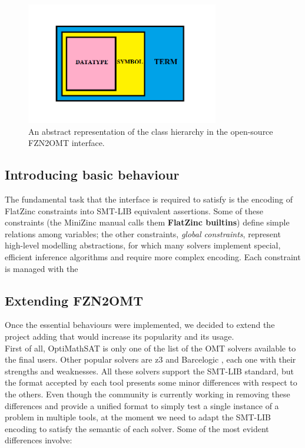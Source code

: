 \begin{figure}
    \centering
    \includegraphics[width=0.75\textwidth]{images/hierarchy.png}
    \caption{An abstract representation of the class hierarchy in the open-source FZN2OMT interface.}
    \label{fig:my_label}
\end{figure}

\subsection{Introducing basic behaviour}

The fundamental task that the interface is required to satisfy is the encoding of FlatZinc constraints into SMT-LIB equivalent assertions. Some of these constraints (the MiniZinc manual calls them \textbf{FlatZinc builtins}) define simple relations among variables; the other constraints, \textit{global constraints}, represent high-level modelling abstractions, for which many solvers implement special, efficient inference algorithms and require more complex encoding. Each constraint is managed with the 

\subsection{Extending FZN2OMT}

Once the essential behaviours were implemented, we decided to extend the project adding that would increase its popularity and its usage.\\
First of all, OptiMathSAT is only one of the list of the OMT solvers available to the final users. Other popular solvers are z3 \cite{z3prover} and Barcelogic \cite{barcelogic}, each one with their strengths and weaknesses. All these solvers support the SMT-LIB standard, but the format accepted by each tool presents some minor differences with respect to the others. Even though the community is currently working in removing these differences and provide a unified format to simply test a single instance of a problem in multiple tools, at the moment we need to adapt the SMT-LIB encoding to satisfy the semantic of each solver. Some of the most evident differences involve:

